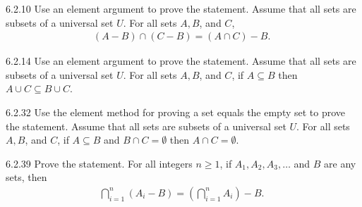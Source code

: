 \documentclass[11pt]{article}
\begin{document}
\begin{question}
    {6.2.10}
    {
        Use an element argument to prove the statement.
        Assume that all sets are subsets of a universal set $U$.
        For all sets $A, B$, and $C$,
        \begin{align*}
            (A-B) \cap(C-B)=(A \cap C)-B \text{. }
        \end{align*}
        \vspace{-\baselineskip}
    }
\end{question}

\begin{question}
    {6.2.14}
    {
        Use an element argument to prove the statement.
        Assume that all sets are subsets of a universal set $U$.
        For all sets $A, B$, and $C$, if $A \subseteq B$ then $A \cup C \subseteq B \cup C$.
    }
\end{question}

\begin{question}
    {6.2.32}
    {
        Use the element method for proving a set equals the empty set to prove the statement.
        Assume that all sets are subsets of a universal set $U$.
        For all sets $A, B$, and $C$, if $A \subseteq B$ and $B \cap C=\emptyset$ then $A \cap C=\emptyset$.
    }
\end{question}

\begin{question}
    {6.2.39}
    {
        Prove the statement.
        For all integers $n \geq 1$, if $A_1, A_2, A_3, \ldots$ and $B$ are any sets, then
        \begin{align*}
            \bigcap_{i=1}^n (A_i - B) = \left(\bigcap_{i=1}^n A_i \right) - B \text{. }
        \end{align*}
    }
\end{question}
\end{document}
